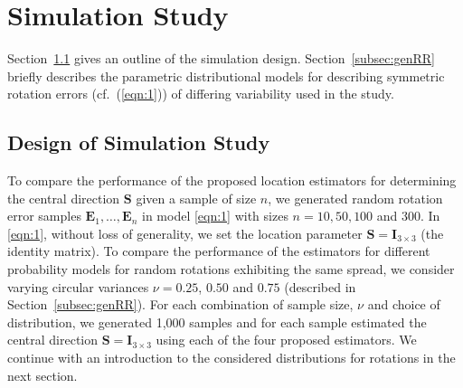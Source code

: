 \section{Simulation Study}\label{ch:simulation}

Section~\ref{subsec:simdesign} gives an outline of the simulation design.  Section~\ref{subsec:genRR} briefly describes the parametric distributional models for describing symmetric rotation errors (cf.~(\ref{eqn:1})) of differing variability used in the study. 
\subsection{Design of Simulation Study}
\label{subsec:simdesign}
To compare the performance of the proposed location estimators for determining the central direction $\bm{S}$ given a sample of size $n$, we generated random rotation error samples  $\bm E_1, \ldots, \bm E_n$  in model \eqref{eqn:1} with sizes $n=10, 50, 100$ and 300. In \eqref{eqn:1}, without loss of generality, we set the location parameter $\bm S=\bm I_{3\times 3}$ (the identity matrix). To compare the performance of the estimators for different probability models for random rotations exhibiting the same spread, %
we consider varying circular variances $\nu=0.25$, $0.50$ and $0.75$ (described in Section~\ref{subsec:genRR}). For each combination of sample size, $\nu$ and choice of distribution, we generated 1,000 samples and for each sample estimated the central direction  $\bm S=\bm I_{3\times 3}$ using each of the four proposed estimators.  We continue with an introduction to the considered distributions for rotations in the next section.



